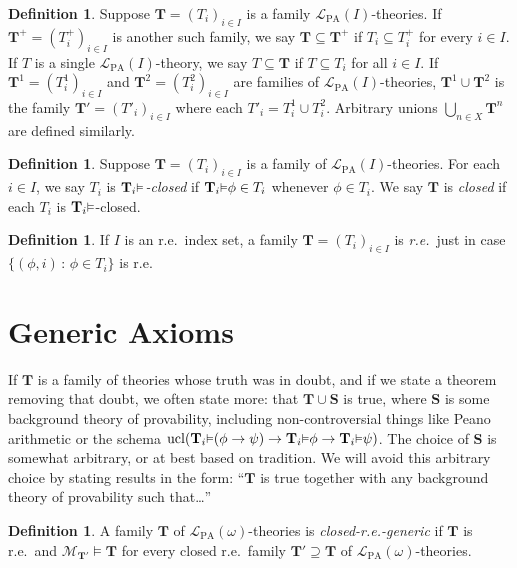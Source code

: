 \documentclass[reqno]{article}
\theoremstyle{definition}
\newtheorem{definition}[theorem]{Definition}
\def\L{\mathscr{L}}
\def\M{\mathscr{M}}
\def\T{\mathbf{T}}
\def\S{\mathbf{S}}
\def\LPA{\L_{\mathrm{PA}}}
\renewcommand{\Pr}[1]{\T_{#1}\mbox{\small${\vDash}$}}
\newcommand{\ucl}[1]{\mathrm{ucl}(#1)}
\begin{document}
\begin{definition}
Suppose $\T=(T_i)_{i\in I}$ is a family $\LPA(I)$-theories.
%
%
If $\T^+=(T^+_i)_{i\in I}$ is another such family, we say $\T\subseteq\T^+$
if $T_i\subseteq T^+_i$ for every $i\in I$.
If $T$ is a single $\LPA(I)$-theory,
we say $T\subseteq\T$ if $T\subseteq T_i$ for all $i\in I$.
If $\T^1=(T^1_i)_{i\in I}$ and $\T^2=(T^2_i)_{i\in I}$
are families of $\LPA(I)$-theories, $\T^1\cup\T^2$
is the family $\T'=(T'_i)_{i\in I}$ where each $T'_i=T^1_i\cup T^2_i$.
Arbitrary unions $\bigcup_{n\in X}\T^n$ are defined similarly.
\end{definition}


\begin{definition}
Suppose $\T=(T_i)_{i\in I}$ is a family of $\LPA(I)$-theories.
For each $i\in I$, we say $T_i$ is \emph{$\Pr i$-closed} if
$\Pr i\phi\in T_i$ whenever $\phi\in T_i$.
We say $\T$ is \emph{closed} if each $T_i$ is $\Pr i$-closed.
\end{definition}

\begin{definition}
If $I$ is an r.e.~index set, a family $\T=(T_i)_{i\in I}$ is \emph{r.e.}~just in case
$\{(\phi,i)\,:\,\phi\in T_i\}$ is r.e.
\end{definition}

\section{Generic Axioms}


If $\T$ is a family of
theories whose truth was in doubt,
and if we state a theorem removing that doubt,
we often state more:
that $\T\cup\S$
is true,
where $\S$ is some
background theory of provability, including non-controversial things
like Peano arithmetic or the schema $\ucl{\Pr i(\phi\rightarrow\psi)\rightarrow\Pr i\phi\rightarrow\Pr i\psi}$.
The choice of $\S$ is somewhat arbitrary, or at best based on tradition.
We will avoid this arbitrary choice by stating results in the form:
``$\T$ is true together with any background theory of provability such that\ldots''


\begin{definition}
\label{closedregenericdefn}
A family $\T$ of $\LPA(\omega)$-theories is
\emph{closed-r.e.-generic}
if $\T$ is r.e.~and
$\M_{\T'}\models\T$ for every closed r.e.~family $\T'\supseteq\T$ of $\LPA(\omega)$-theories.
\end{definition}
\end{document}
